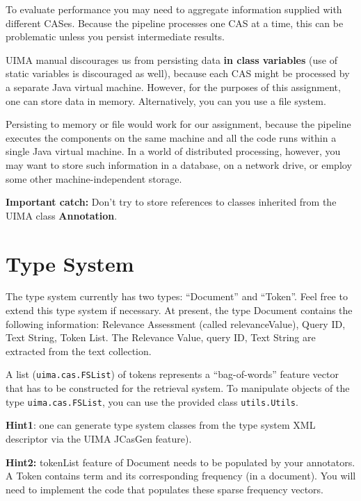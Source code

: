 \documentclass[oneside,11pt]{memoir}
\begin{document}
To evaluate performance you may need to aggregate information
supplied with different CASes.
Because the pipeline processes one CAS at a time,
this can be problematic unless you persist intermediate results.

UIMA manual discourages us from persisting data \textbf{in class variables} (use 
of static variables is discouraged as well),
because each CAS might be processed by a separate Java virtual machine.
However, for the purposes of this assignment, one can store data in memory.
Alternatively, you can you use a file system.

Persisting to memory or file would work for our assignment, 
because the pipeline executes the components on the same machine 
and all the code runs within a single Java virtual machine.
In a world of distributed processing, however, you may want to store such information in a database,
on a network drive, or employ some other machine-independent storage.

\textbf{Important catch:} Don't try to store references to classes inherited from the
UIMA class \textbf{Annotation}.

\vspace{2em}
\section{Type System}\label{SectionType}
The type system currently has two types: ``Document'' and ``Token''.
Feel free to extend this type system if necessary.
At present, the type Document contains the following information: Relevance Assessment (called relevanceValue), Query ID, Text String, Token
List. The Relevance Value, query ID, Text String are extracted from the text collection. 

A list (\texttt{uima.cas.FSList}) of tokens 
represents a ``bag-of-words'' feature vector
that has to be constructed for the retrieval system. 
To manipulate objects of the type \texttt{uima.cas.FSList},
you can use the provided class \texttt{utils.Utils}.

\textbf{Hint1}:
one can generate type system classes from the type system XML descriptor via the UIMA JCasGen feature).

\textbf{Hint2:} tokenList feature of Document needs to be populated by your annotators. 
A Token contains term and its corresponding frequency (in a document). 
You will need to implement the code that populates these sparse frequency vectors.


\end{document}
